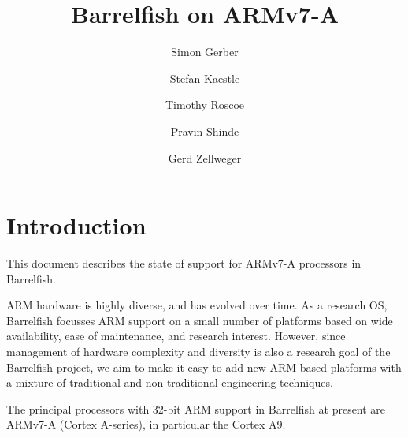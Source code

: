 \documentclass[a4paper,twoside]{report} %
\title{Barrelfish on ARMv7-A}   %
\author{Simon Gerber \and Stefan Kaestle \and Timothy Roscoe \and
  Pravin Shinde \and Gerd Zellweger}
\begin{document}
\maketitle

\newcommand{\code}[1]{{\lstinline!#1!}}
\newcommand{\file}[1]{{\lstinline!#1!}}
\newcommand{\mode}[1]{\texttt{#1} mode\xspace}

\lstset{%
  basicstyle=\small\ttfamily,
  escapechar=@
}

%
%
\begin{versionhistory}
\end{versionhistory}

\tableofcontents		%


\newcommand{\eclipse}{ECL\textsuperscript{i}PS\textsuperscript{e}\xspace}
\newcommand{\codesize}{\scriptsize}
\newcommand{\note}[1]{[\textcolor{red}{\emph{#1}}]}

\chapter{Introduction}

This document describes the state of support for ARMv7-A processors in
Barrelfish.

ARM hardware is highly diverse, and has evolved over time.  As a
research OS, Barrelfish focusses ARM support on a small number of
platforms based on wide availability, ease of maintenance, and
research interest.   However, since management of hardware complexity
and diversity is also a research goal of the Barrelfish project, we
aim to make it easy to add new ARM-based platforms with a mixture of
traditional and non-traditional engineering techniques. 

The principal processors with 32-bit ARM support in Barrelfish at present are
ARMv7-A (Cortex A-series), in particular the Cortex A9. 
\end{document}
